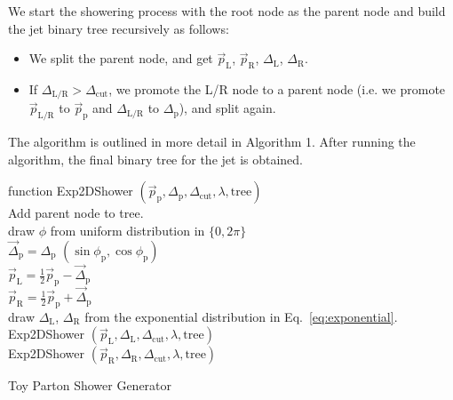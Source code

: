 \documentclass[12pt]{article}
\begin{document}
We start the showering process with the root node as the parent node and build the jet binary tree recursively as follows:
\begin{itemize}

\item We split the parent node, and get $\vec{p}_\text{L}$, $\vec{p}_\text{R}$, $\Delta_\text{L}$, $\Delta_\text{R}$.

\item If $\Delta_\text{L/R} > \Delta_\text{cut}$, we promote the L/R node to a parent node (i.e. we promote $\vec{p}_\text{L/R}$ to $\vec{p}_\text{p}$ and $\Delta_\text{L/R}$ to $\Delta_\text{p}$), and split again.

\end{itemize}

The algorithm is outlined in more detail in Algorithm 1. After running the algorithm, the final binary tree for the jet is obtained.

\begin{algorithm}

    function Exp2DShower $(\vec{p}_{\text{p}}, \Delta_\text{p}, \Delta_\text{cut}, \lambda, \text{tree})$\\
    \Indp
    Add parent node to tree. \\
      {
      	draw $\phi$ from uniform distribution in $\{0,2\pi\}$\\
	$\vec{\Delta}_\text{p}= \Delta_\text{p}\,\,(\sin\phi_\text{p},\cos\phi_\text{p})$\\
      	$\vec{p}_\text{L}= \frac{1}{2} \vec{p}_\text{p} - \vec{\Delta}_\text{p}$  \\
        $\vec{p}_\text{R}= \frac{1}{2} \vec{p}_\text{p} +\vec{\Delta}_\text{p}$\\
        draw $\Delta_\text{L}$, $\Delta_\text{R}$ from the exponential distribution in Eq.~\ref{eq:exponential}.\\
	Exp2DShower $(\vec{p}_{\text{L}}, \Delta_\text{L}, \Delta_\text{cut}, \lambda, \text{tree})$\\
	Exp2DShower $(\vec{p}_{\text{R}}, \Delta_\text{R}, \Delta_\text{cut}, \lambda, \text{tree})$\\
      }
    \caption{Toy Parton Shower Generator}
\end{algorithm}
\end{document}
